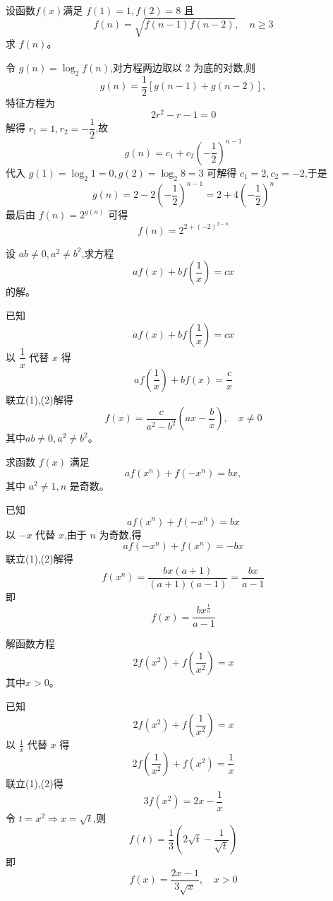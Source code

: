 \begin{questions}
    \question 设函数$f(x)$满足 $f(1)=1, f(2)=8$ 且 
    \[
    f(n) = \sqrt{f(n-1)f(n-2)}, \quad n \ge 3
    \]
    求 $f(n)$。
    \begin{solution}
        令 $g(n) = \log_2 f(n)$,对方程两边取以 2 为底的对数,则 
        \[
        g(n) = \frac{1}{2} [g(n-1) + g(n-2)],
        \]
        特征方程为 
        \[
        2r^2 - r - 1 = 0
        \]
        解得 $r_1 = 1, r_2 = -\dfrac{1}{2}$,故 
        \[
        g(n) = c_1 + c_2\left(-\frac{1}{2}\right)^{n-1}
        \]
        代入 $g(1) = \log_2 1 = 0,g(2) = \log_2 8=3$ 可解得 $c_1 = 2, c_2 = -2$,于是
        \[
        g(n) = 2 - 2\left(-\frac{1}{2}\right)^{n-1} = 2 + 4\left(-\frac{1}{2}\right)^n
        \]
        最后由 $f(n) = 2^{g(n)}$ 可得
        \[
        f(n) = 2^{2 + (-2)^{2-n}}
        \]
    \end{solution}

    \question 设 $ab \neq 0, a^2 \neq b^2$,求方程 
    \[
    af(x) + bf\left(\frac{1}{x}\right) = cx
    \]
    的解。
    \begin{solution}
        已知 
        \[
        af(x) + bf\left(\frac{1}{x}\right) = cx \tag{1}
        \]
        以 $\dfrac{1}{x}$ 代替 $x$ 得
        \[
        af\left(\frac{1}{x}\right) + bf(x) = \frac{c}{x} \tag{2}
        \]
        联立(1),(2)解得
        \[
        f(x) = \frac{c}{a^2 - b^2} \left(ax - \frac{b}{x}\right) ,\quad x \neq 0
        \]
        其中$ab \neq 0, a^2 \neq b^2$。
    \end{solution}

    \question 求函数 $f(x)$ 满足 
    \[
    af(x^n) + f(-x^n) = bx,
    \]
    其中 $a^2 \neq 1, n$ 是奇数。
    \begin{solution}
        已知 
        \[
        af(x^n) + f(-x^n) = bx \tag{1}
        \]
        以 $-x$ 代替 $x$,由于 $n$ 为奇数,得
        \[
        af(-x^n) + f(x^n) = -bx \tag{2}
        \]
        联立(1),(2)解得
        \[
        f(x^n) = \frac{bx(a+1)}{(a+1)(a-1)} = \frac{bx}{a-1}
        \]
        即 
        \[
        f(x) = \frac{bx^{\frac{1}{n}}}{a-1}
        \]
    \end{solution}

    \question 解函数方程 
    \[
    2f(x^2) + f\left(\frac{1}{x^2}\right) = x
    \]
    其中$x > 0$。
    \begin{solution}
        已知 
        \[
        2f(x^2) + f\left(\frac{1}{x^2}\right) = x \tag{1}
        \]
        以 $\frac{1}{x}$ 代替 $x$ 得
        \[
        2f\left(\frac{1}{x^2}\right) + f(x^2) = \frac{1}{x} \tag{2}
        \]
        联立(1),(2)得
        \[
        3f(x^2) = 2x - \frac{1}{x}
        \]
        令 $t = x^2 \Rightarrow x = \sqrt{t}$,则 
        \[
        f(t) = \frac{1}{3}\left(2\sqrt{t} - \frac{1}{\sqrt{t}}\right)
        \]
        即 
        \[
        f(x) = \frac{2x-1}{3\sqrt{x}}, \quad x > 0
        \]
    \end{solution}


\end{questions}
